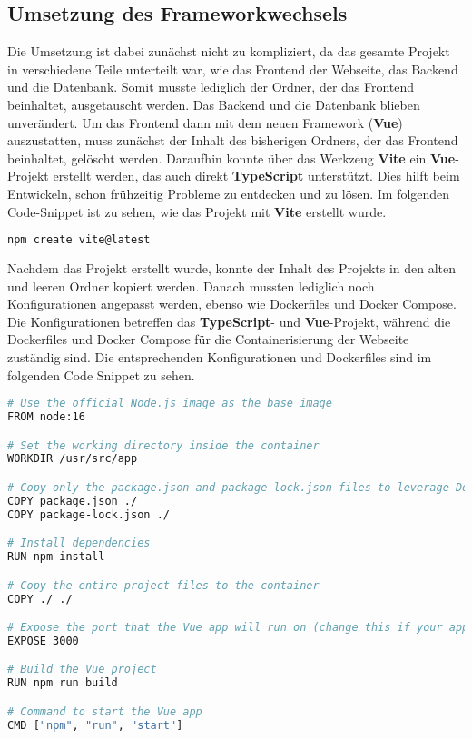 \subsection{Umsetzung des Frameworkwechsels}

Die Umsetzung ist dabei zunächst nicht zu kompliziert, da das gesamte Projekt in verschiedene Teile unterteilt war, wie das Frontend der Webseite, das Backend und die Datenbank. Somit musste lediglich der Ordner, der das Frontend beinhaltet, ausgetauscht werden. Das Backend und die Datenbank blieben unverändert. Um das Frontend dann mit dem neuen Framework (\textbf{Vue}) auszustatten, muss zunächst der Inhalt des bisherigen Ordners, der das Frontend beinhaltet, gelöscht werden. Daraufhin konnte über das Werkzeug \textbf{Vite} ein \textbf{Vue}-Projekt erstellt werden, das auch direkt \textbf{TypeScript} unterstützt. Dies hilft beim Entwickeln, schon frühzeitig Probleme zu entdecken und zu lösen. Im folgenden Code-Snippet ist zu sehen, wie das Projekt mit \textbf{Vite} erstellt wurde.

\begin{lstlisting}[language={bash}, caption={Initialisierung des Vue Projektes mit Vite \cite{vitejs-getting-started}}]
npm create vite@latest
\end{lstlisting}

Nachdem das Projekt erstellt wurde, konnte der Inhalt des Projekts in den alten und leeren Ordner kopiert werden. Danach mussten lediglich noch Konfigurationen angepasst werden, ebenso wie Dockerfiles und Docker Compose. Die Konfigurationen betreffen das \textbf{TypeScript}- und \textbf{Vue}-Projekt, während die Dockerfiles und Docker Compose für die Containerisierung der Webseite zuständig sind. Die entsprechenden Konfigurationen und Dockerfiles sind im folgenden Code Snippet zu sehen.

\begin{lstlisting}[language={bash}, caption={Dockerfile für das Vue Projekt}]
# Use the official Node.js image as the base image
FROM node:16

# Set the working directory inside the container
WORKDIR /usr/src/app

# Copy only the package.json and package-lock.json files to leverage Docker cache
COPY package.json ./
COPY package-lock.json ./

# Install dependencies
RUN npm install

# Copy the entire project files to the container
COPY ./ ./

# Expose the port that the Vue app will run on (change this if your app uses a different port)
EXPOSE 3000

# Build the Vue project
RUN npm run build

# Command to start the Vue app
CMD ["npm", "run", "start"]
\end{lstlisting}

